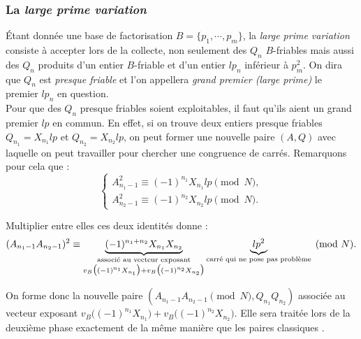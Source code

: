 \subsubsection{La \textit{large prime variation }}

Étant donnée une base de factorisation $B = \{ p_1, \cdots, p_m\}$, la
\textit{large prime variation } consiste à accepter lors de la collecte, non
seulement des $Q_n$ $B$-friables mais aussi des $Q_n$ produits d'un entier
$B$-friable et d'un entier $lp_n$ inférieur à $p_m^2$. On dira que $Q_n$ est
\emph{presque friable} et l'on appellera \emph{grand premier (large prime)} le
premier $lp_n$ en question. \\

Pour que des $Q_n$ presque friables soient exploitables, il faut qu'ils aient
un grand premier $lp$ en commun. En effet, si on trouve deux entiers presque
friables $Q_{n_1} = X_{n_1}lp $ et $Q_{n_2} =  X_{n_2}lp $, on peut former une
nouvelle paire $(A,Q)$ avec laquelle on peut travailler pour chercher une 
congruence de carrés. Remarquons pour cela que :
\[\begin{cases}
	A_{n_1 -1}^2 \equiv (-1)^{n_1} X_{n_1}lp\pmod{N}, \\
	A_{n_2 -1}^2 \equiv (-1)^{n_2} X_{n_2}lp\pmod{N}.
\end{cases}\]

Multiplier entre elles ces deux identités donne :
\[(A_{n_1 -1} A_{n_2 -1})^2 \equiv 
     \underbrace{(-1)^{n_1 + n_2} X_{n_1} X_{n_2}}_
            {\begin{subarray}{c}\text{associé au vecteur exposant}\\
             v_{B} \big( (-1 )^{n_1} X_{n_1} \big)
             + v_{B} \big( (-1 )^{n_2} X_{n_2} \big) \end{subarray}
             }
    \underbrace{lp^2}_{\text{carré qui ne pose pas problème}}
    \pmod{N}.
 \]
  
On forme donc la nouvelle paire $ (A_{n_1-1}A_{n_2 -1} \pmod{N},
Q_{n_1}Q_{n_2}) $ associée au vecteur exposant $v_{B} \big( (-1 )^{n_1} X_{n_1}
\big)+ v_{B} \big( (-1 )^{n_2} X_{n_2} \big) $.  Elle sera traitée lors de la
deuxième phase exactement de la même manière que les paires \og classiques
\fg{}.\\

